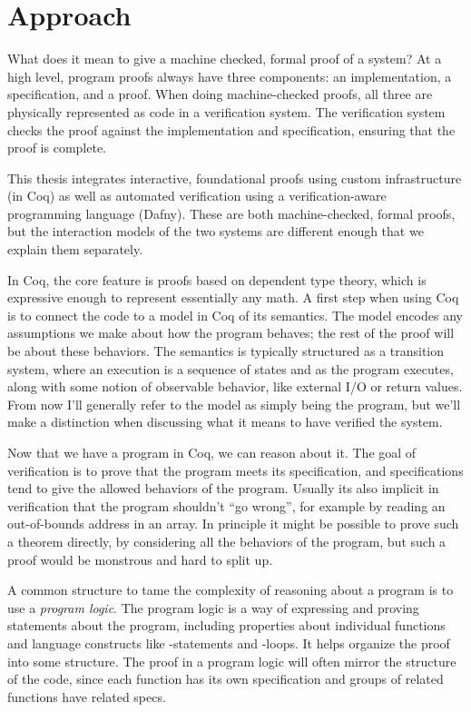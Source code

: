 \section{Approach}

What does it mean to give a machine checked, formal proof of a system? At a high
level, program proofs always have three components: an implementation, a
specification, and a proof. When doing machine-checked proofs, all three are
physically represented as code in a verification system. The verification system
checks the proof against the implementation and specification, ensuring that the
proof is complete.

This thesis integrates interactive, foundational proofs using custom
infrastructure (in Coq) as well as automated verification using a
verification-aware programming language (Dafny). These are both machine-checked,
formal proofs, but the interaction models of the two systems are different
enough that we explain them separately.

In Coq, the core feature is proofs based on dependent type theory, which is
expressive enough to represent essentially any math. A first step when using Coq
is to connect the code to a model in Coq of its semantics. The model encodes any
assumptions we make about how the program behaves; the rest of the proof will be
about these behaviors. The semantics is typically structured as a transition
system, where an execution is a sequence of states and as the program executes,
along with some notion of observable behavior, like external I/O or return
values. From now I'll generally refer to the model as simply being the program,
but we'll make a distinction when discussing what it means to have verified
the system.

Now that we have a program in Coq, we can reason about it. The goal of
verification is to prove that the program meets its specification, and
specifications tend to give the allowed behaviors of the program. Usually its
also implicit in verification that the program shouldn't ``go wrong'', for
example by reading an out-of-bounds address in an array. In principle it might
be possible to prove such a theorem directly, by considering all the behaviors
of the program, but such a proof would be monstrous and hard to split up.

A common structure to tame the complexity of reasoning about a program is to use
a \emph{program logic}. The program logic is a way of expressing and proving
statements about the program, including properties about individual functions
and language constructs like -statements and -loops. It helps
organize the proof into some structure. The proof in a program logic will often
mirror the structure of the code, since each function has its own specification
and groups of related functions have related specs.

